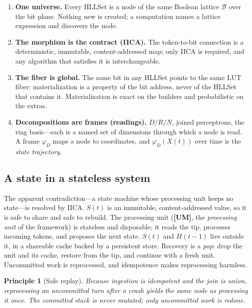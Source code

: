 \documentclass[11pt,a4paper]{article}
\newtheorem{principle}{Principle}[section]
\theoremstyle{remark}
\newcommand{\Lat}{\ensuremath{\mathcal{B}}}           %
\begin{document}
\begin{enumerate}[leftmargin=*,nosep]
  \item \textbf{One universe.} Every HLLSet is a node of the same Boolean
    lattice $\Lat$ over the bit plane. Nothing new is created; a computation
    names a lattice expression and discovers the node.
  \item \textbf{The morphism is the contract (IICA).} The token-to-bit
    connection is a deterministic, immutable, content-addressed map; only IICA
    is required, and any algorithm that satisfies it is interchangeable.
  \item \textbf{The fiber is global.} The same bit in any HLLSet points to the
    same LUT fiber: materialization is a property of the bit address, never of
    the HLLSet that contains it. Materialization is exact on the builders and
    probabilistic on the extras.
  \item \textbf{Decompositions are frames (readings).} $D/R/N$, joined
    perceptrons, the ring basis---each is a named set of dimensions through
    which a node is read. A frame $\varphi_D$ maps a node to coordinates, and
    $\varphi_D(X(t))$ over time is the \emph{state trajectory}.
\end{enumerate}

\subsection{A state in a stateless system}

The apparent contradiction---a state machine whose processing unit keeps no
state---is resolved by IICA. $S(t)$ is an immutable, content-addressed value, so
it is safe to share and safe to rebuild. The processing unit (\textbf{[UM]}, the
\emph{processing unit} of the framework) is stateless and disposable; it reads
the tip, processes incoming tokens, and proposes the next state. $S(t)$ and
$H(t{-}1)$ live outside it, in a shareable cache backed by a persistent store.
Recovery is a \emph{pop}: drop the unit and its cache, restore from the tip, and
continue with a fresh unit. Uncommitted work is reprocessed, and idempotence
makes reprocessing harmless.

\begin{principle}[Safe replay]
Because ingestion is idempotent and the join is union, reprocessing an
uncommitted turn after a crash yields the same node as processing it once. The
committed stack is never mutated; only uncommitted work is redone.
\end{principle}
\end{document}
